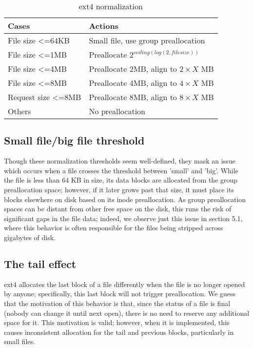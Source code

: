 \documentclass{acm_proc_article-sp}
\begin{document}
\begin{table}[ht]
\caption{ext4 normalization}
\begin{center}
    \begin{tabular}{ | l | p{5cm} |}
    \hline
    \bf{Cases} & \bf{Actions}  \\ \hline
    File size <=64KB & Small file, use group preallocation \\ \hline
    File size <=1MB & Preallocate $2^{ceiling(log(2, filesize))}$ \\ \hline
    File size <=4MB & Preallocate 2MB, align to $2\times X$ MB \\ \hline
    File size <=8MB & Preallocate 4MB, align to $4\times X$ MB \\ \hline
    Request size <=8MB & Preallocate 8MB, align to $8\times X$ MB  \\ \hline
    Others & No preallocation \\ \hline
    
    \end{tabular}
\end{center}
\label{table:normalization}
\end{table}

\subsection{Small file/big file threshold}
Though these normalization thresholds seem well-defined, they mask an issue which occurs when a file crosses the threshold between 'small' and 'big'.  While the file is less than 64 KB in size, its data blocks are allocated from the group preallocation space; however, if it later grows past that size, it must place its blocks elsewhere on disk based on its inode preallocation.  As group preallocation spaces can be distant from other free space on the disk, this runs the risk of significant gaps in the file data; indeed, we observe just this issue in section 5.1, where this behavior is often responsible for the files being stripped across gigabytes of disk.

\subsection{The tail effect}
ext4 allocates the last block of a file differently when the file is no longer opened by anyone; specifically, this last block will not trigger preallocation. We guess that the motivation of this behavior is that, since the status of a file is final (nobody can change it until next open), there is no need to reserve any additional space for it. This motivation is valid; however, when it is implemented, this causes inconsistent allocation for the tail and previous blocks, particularly in small files.
\end{document}
